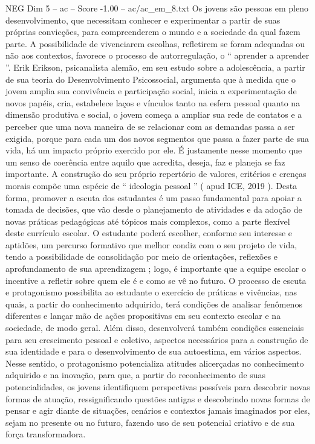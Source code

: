\begin{textsample}{NEG Dim 5 – ac – Score -1.00 – ac/ac\_em\_8.txt}
Os jovens são pessoas em pleno desenvolvimento, que necessitam conhecer e experimentar a partir de suas próprias convicções, para compreenderem o mundo e a sociedade da qual fazem parte.
A possibilidade de vivenciarem escolhas, refletirem se foram adequadas ou não aos contextos, favorece o processo de autorregulação, o “ aprender a aprender ”.
Erik Erikson, psicanalista alemão, em seu estudo sobre a adolescência, a partir de sua teoria do Desenvolvimento Psicossocial, argumenta que à medida que o jovem amplia sua convivência e participação social, inicia a experimentação de novos papéis, cria, estabelece laços e vínculos tanto na esfera pessoal quanto na dimensão produtiva e social, o jovem começa a ampliar sua rede de contatos e a perceber que uma nova maneira de se relacionar com as demandas passa a ser exigida, porque para cada um dos novos segmentos que passa a fazer parte de sua vida, há um impacto próprio exercido por ele.
É justamente nesse momento que um senso de coerência entre aquilo que acredita, deseja, faz e planeja se faz importante.
A construção do seu próprio repertório de valores, critérios e crenças morais compõe uma espécie de “ ideologia pessoal ” ( apud ICE, 2019 ).
Desta forma, promover a escuta dos estudantes é um passo fundamental para apoiar a tomada de decisões, que vão desde o planejamento de atividades e da adoção de novas práticas pedagógicas até tópicos mais complexos, como a parte flexível deste currículo escolar.
O estudante poderá escolher, conforme seu interesse e aptidões, um percurso formativo que melhor condiz com o seu projeto de vida, tendo a possibilidade de consolidação por meio de orientações, reflexões e aprofundamento de sua aprendizagem ; logo, é importante que a equipe escolar o incentive a refletir sobre quem ele é e como se vê no futuro.
O processo de escuta e protagonismo possibilita ao estudante o exercício de práticas e vivências, nas quais, a partir do conhecimento adquirido, terá condições de analisar fenômenos diferentes e lançar mão de ações propositivas em seu contexto escolar e na sociedade, de modo geral.
Além disso, desenvolverá também condições essenciais para seu crescimento pessoal e coletivo, aspectos necessários para a construção de sua identidade e para o desenvolvimento de sua autoestima, em vários aspectos.
Nesse sentido, o protagonismo potencializa atitudes alicerçadas no conhecimento adquirido e na inovação, para que, a partir do reconhecimento de suas potencialidades, os jovens identifiquem perspectivas possíveis para descobrir novas formas de atuação, ressignificando questões antigas e descobrindo novas formas de pensar e agir diante de situações, cenários e contextos jamais imaginados por eles, sejam no presente ou no futuro, fazendo uso de seu potencial criativo e de sua força transformadora.

\end{textsample}
